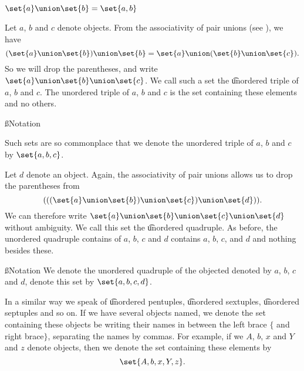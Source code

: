 

$\set{a} \union \set{b} = \set{a, b}$


Let $a$, $b$ and $c$ denote objects.
From the associativity of pair unions (see ), we have
\[
  (\set{a} \union \set{b}) \union \set{b} = \set{a} \union (\set{b} \union \set{c}).
\]
So we will drop the parentheses, and write $\set{a} \union \set{b} \union \set{c}$.
We call such a set the \t{unordered triple} of $a$, $b$ and $c$.
The unordered triple of $a$, $b$ and $c$ is the set containing these elements and no others.

\ss{Notation}

Such sets are so commonplace that we denote the unordered triple of $a$, $b$ and $c$ by $\set{a, b, c}$.


Let $d$ denote an object.
Again, the associativity of pair unions allows us to drop the parentheses from
\[
  (((\set{a} \union \set{b}) \union \set{c}) \union \set{d})).
\]
We can therefore write $\set{a} \union \set{b} \union \set{c} \union \set{d}$ without ambiguity.
We call this set the \t{unordered quadruple}.
As before, the unordered quadruple contains of $a$, $b$, $c$ and $d$ contains $a$, $b$, $c$, and $d$ and nothing besides these.

\ss{Notation}
We denote the unordered quadruple of the objected denoted by $a$, $b$, $c$ and $d$, denote this set by $\set{a, b, c, d}$.


In a similar way we speak of \t{unordered pentuples}, \t{unordered sextuples}, \t{unordered septuples} and so on.
If we have several objects named, we denote the set containing these objects be writing their names in between the left brace $\{$ and right brace$\}$, separating the names by commas.
For example, if we $A$, $b$, $x$ and $Y$ and $z$ denote objects, then we denote the set containing these elements by
\[
	\set{A, b, x, Y, z}.
\]
